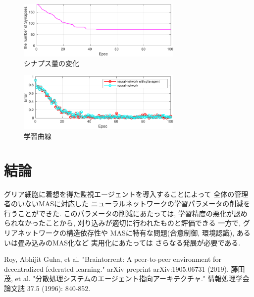 \documentclass[a4paper,9pt,twocolumn]{jsarticle}
\begin{document}
\vspace{-2zh}
\begin{figure}[H]
  \centering
  \includegraphics[width=8cm]{SynapseNum-crop.pdf} 
  \caption{シナプス量の変化}
  \label{fig:SynapseNum}
\end{figure}
\vspace{-2zh}
\begin{figure}[H]
  \centering
  \includegraphics[width=8cm]{LearningCurve-crop.pdf} 
  \caption{学習曲線}
  \label{fig:LearningCurve}
\end{figure}
\section{結論}
グリア細胞に着想を得た監視エージェントを導入することによって
全体の管理者のいないMASに対応した
ニューラルネットワークの学習パラメータの削減を行うことができた.
このパラメータの削減にあたっては, 学習精度の悪化が認められなかったことから, 
刈り込みが適切に行われたものと評価できる
一方で, グリアネットワークの構造依存性や
MASに特有な問題(合意制御, 環境認識), あるいは畳み込みのMAS化など
実用化にあたっては
さらなる発展が必要である.
 \begin{thebibliography}{99}
  Roy, Abhijit Guha, et al. "Braintorrent: A peer-to-peer environment for decentralized federated learning." arXiv preprint arXiv:1905.06731 (2019).
  藤田茂, et al. "分散処理システムのエージェント指向アーキテクチャ." 情報処理学会論文誌 37.5 (1996): 840-852.
\end{thebibliography}
 
\end{document}
